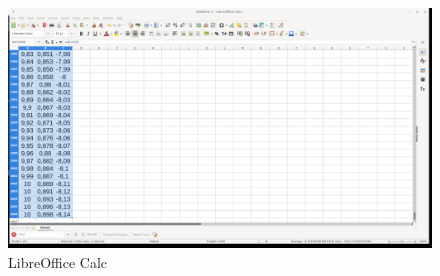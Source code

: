 \begin{figure}[h!]		
	\centering
   	\includegraphics[width=8.0in]{pictures/picture_012.png}
  	\caption{LibreOffice Calc}
   	\label{fig:LibreOfficeCalc012}
\end{figure}